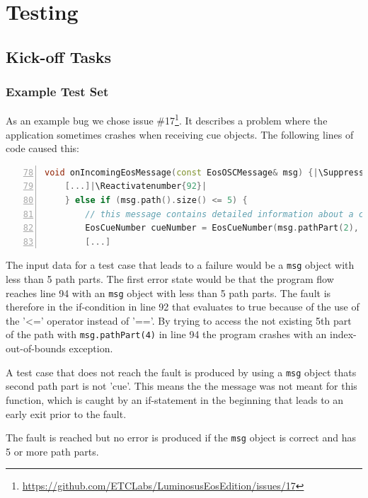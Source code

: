 \documentclass{scrreprt}
\makeatletter
\let\origthelstnumber\thelstnumber
\newcommand*\Suppressnumber{%
	\lst@AddToHook{OnNewLine}{%
		\let\thelstnumber\relax%
		\advance\c@lstnumber-\@ne\relax%
	}%
}
\newcommand*\Reactivatenumber[1]{%
	\setcounter{lstnumber}{\numexpr#1-1\relax}
	\lst@AddToHook{OnNewLine}{%
		\let\thelstnumber\origthelstnumber%
		\refstepcounter{lstnumber}
	}%
}
\makeatother
\begin{document}
\chapter{Testing}

\section{Kick-off Tasks}

\subsection{Example Test Set}

As an example bug we chose issue \#17\footnote{\url{https://github.com/ETCLabs/LuminosusEosEdition/issues/17}}. It describes a problem where the application sometimes crashes when receiving cue objects. The following lines of code caused this:

\bigskip
\begin{lstlisting}[language=C++,
							numbers=left,
							firstnumber=78,
							directivestyle={\color{black}}
							emph={int,char,double,float,unsigned},
							emphstyle={\color{blue}},
							title=src/OSCNetworkManager.cpp]
void onIncomingEosMessage(const EosOSCMessage& msg) {|\Suppressnumber|
    [...]|\Reactivatenumber{92}|
    } else if (msg.path().size() <= 5) {
        // this message contains detailed information about a cue
        EosCueNumber cueNumber = EosCueNumber(msg.pathPart(2), msg.pathPart(3), msg.pathPart(4));|\Suppressnumber|
        [...]
\end{lstlisting}
\bigskip

The input data for a test case that leads to a failure would be a \texttt{msg} object with less than 5 path parts. The first error state would be that the program flow reaches line 94 with an \texttt{msg} object with less than 5 path parts. The fault is therefore in the if-condition in line 92 that evaluates to true because of the use of the '<=' operator instead of '=='. By trying to access the not existing 5th part of the path with \texttt{msg.pathPart(4)} in line 94 the program crashes with an index-out-of-bounds exception.

A test case that does not reach the fault is produced by using a \texttt{msg} object thats second path part is not 'cue'. This means the the message was not meant for this function, which is caught by an if-statement in the beginning that leads to an early exit prior to the fault.

The fault is reached but no error is produced if the \texttt{msg} object is correct and has 5 or more path parts.
\end{document}
